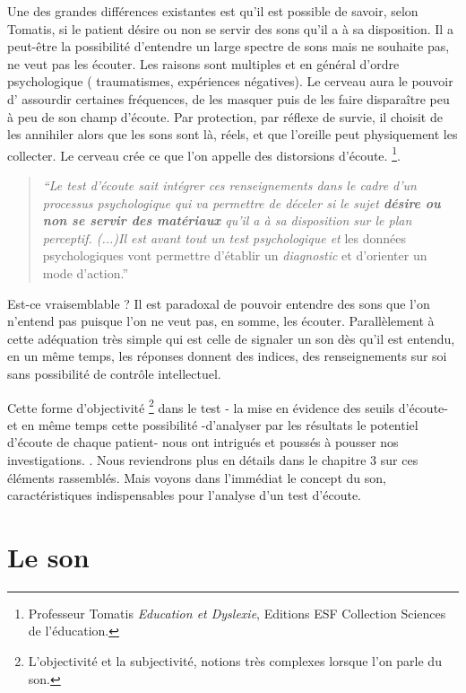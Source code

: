   Une des grandes différences 
  existantes  est  qu'il est
  possible de savoir, selon Tomatis, si le patient désire ou non se servir des sons
  qu'il a à sa disposition. Il a peut-être la possibilité d'entendre un large spectre de
  sons mais ne souhaite pas, ne veut pas les écouter. Les raisons sont multiples et en général d'ordre psychologique ( traumatismes,
  expériences négatives). Le cerveau aura le
  pouvoir d' assourdir certaines fréquences, de les masquer puis de les faire disparaître peu à peu de
  son champ d'écoute. Par protection, par réflexe de survie, il choisit de les
  annihiler alors que les sons sont là, réels, et que  l'oreille peut physiquement les collecter. Le cerveau crée ce
  que l'on appelle des distorsions d'écoute. \footnote{Professeur
    Tomatis \emph{Education et Dyslexie},  Editions ESF
    Collection Sciences de l'éducation.}. %

\begin{quote}
\emph{``Le test d'écoute sait intégrer ces renseignements dans le
cadre d'un processus psychologique qui va permettre de déceler si
le sujet\textbf{ désire ou non se servir des matériaux }qu'il a à sa disposition
sur le plan perceptif. (...)Il est avant tout un test psychologique
et} les données psychologiques vont permettre d'établir un\emph{ diagnostic}
et d'orienter un mode d'action.''
\end{quote}

Est-ce vraisemblable ?
Il est paradoxal de pouvoir  entendre des sons que l'on
n'entend pas puisque l'on ne veut pas, en somme, les écouter. Parallèlement à cette
adéquation très simple qui est celle de signaler un son dès qu'il est 
entendu, en un même temps, les
réponses donnent des indices, des renseignements sur soi sans possibilité de 
contrôle intellectuel.


Cette forme d'objectivité \footnote{L'objectivité et la
  subjectivité, notions très complexes lorsque l'on parle du
  son.} dans le test - la mise en évidence des seuils d'écoute- et en
même temps cette possibilité -d'analyser par les résultats le potentiel d'écoute de
chaque patient- nous ont intrigués et poussés à pousser nos investigations. . Nous  reviendrons plus en détails dans le chapitre 3 sur ces éléments rassemblés.
Mais voyons dans l'immédiat le concept du son, caractéristiques 
indispensables pour l'analyse d'un test d'écoute.

 

\section{Le son}


